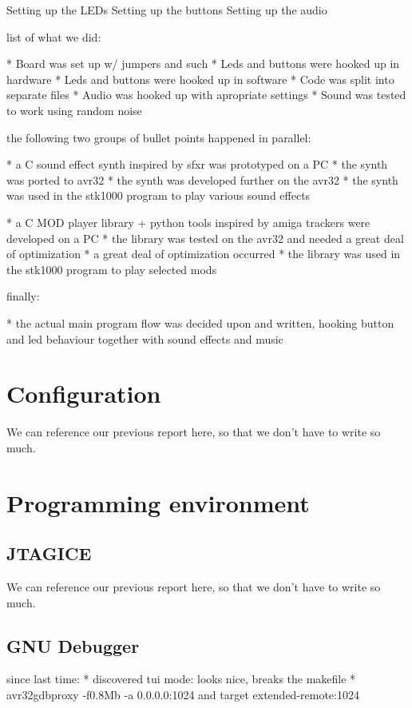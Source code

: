 Setting up the LEDs
Setting up the buttons
Setting up the audio

list of what we did:

* Board was set up w/ jumpers and such
* Leds and buttons were hooked up in hardware
* Leds and buttons were hooked up in software
* Code was split into separate files
* Audio was hooked up with apropriate settings
* Sound was tested to work using random noise


the following two groups of bullet points happened in parallel:

* a C sound effect synth inspired by sfxr was prototyped on a PC
* the synth was ported to avr32
* the synth was developed further on the avr32
* the synth was used in the stk1000 program to play various sound effects

* a C MOD player library + python tools inspired by amiga trackers were developed on a PC
* the library was tested on the avr32 and needed a great deal of optimization
* a great deal of optimization occurred 
* the library was used in the stk1000 program to play selected mods


finally:

* the actual main program flow was decided upon and written, hooking button and led behaviour together with sound effects and music



\section{Configuration}

We can reference our previous report here, so that we don't have to write so much.


\section{Programming environment}

\subsection{JTAGICE}
We can reference our previous report here, so that we don't have to write so much.

\subsection{GNU Debugger}
since last time:
* discovered tui mode: looks nice, breaks the makefile
* avr32gdbproxy -f0.8Mb -a 0.0.0.0:1024 and target extended-remote:1024


